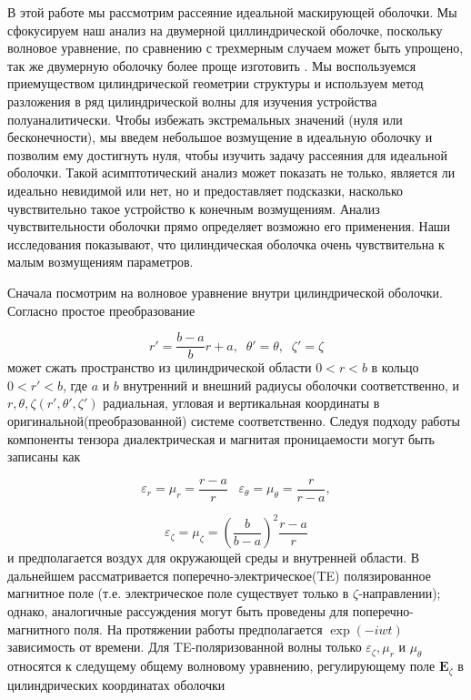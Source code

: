 \documentclass[a4paper, 12pt]{article}
\begin{document}
В этой работе мы рассмотрим рассеяние идеальной маскирующей оболочки.
Мы сфокусируем наш анализ на двумерной циллиндрической
оболочке, поскольку волновое уравнение, по сравнению с трехмерным случаем может быть упрощено, так же двумерную оболочку
более проще изготовить \cite{7}. Мы воспользуемся приемуществом цилиндрической геометрии структуры и используем
метод разложения в ряд цилиндрической волны для изучения устройства полуаналитически. Чтобы избежать экстремальных значений
(нуля или бесконечности), мы введем небольшое возмущение в идеальную оболочку и позволим ему достигнуть нуля, чтобы
изучить задачу рассеяния для идеальной оболочки. Такой асимптотический анализ может показать не только, является ли
идеально невидимой или нет, но и предоставляет подсказки, насколько чувствительно такое устройство к конечным 
возмущениям. Анализ чувствительности оболочки прямо определяет возможно его применения. Наши исследования 
показывают, что цилиндическая оболочка очень чувствительна к малым возмущениям параметров.

Сначала посмотрим на волновое уравнение внутри цилиндрической оболочки. Согласно \cite{1} простое преобразование

\begin{equation}\label{e1}
	r' = \frac{b-a}{b}r+a, \;\; \theta' = \theta, \;\; \zeta' = \zeta
\end{equation}
может сжать пространство из цилиндрической области $0 < r < b$ в кольцо $0 < r' < b$, где $a$ и $b$ внутренний и
внешний радиусы оболочки соответственно, и $r, \theta, \zeta (r', \theta', \zeta')$ радиальная, угловая и вертикальная
координаты в оригинальной(преобразованной) системе соответственно. Следуя подходу работы \cite{1} компоненты тензора 
диалектрическая и магнитая проницаемости могут быть записаны как 

\begin{equation*}
	\varepsilon_r = \mu_r = \frac{r-a}{r} \;\;\; \varepsilon_\theta = \mu_\theta = \frac{r}{r-a},	
\end{equation*}  

\begin{equation}\label{e2}
	\varepsilon_\zeta = \mu_\zeta = (\frac{b}{b-a})^2 \frac{r-a}{r}
\end{equation}
и предполагается воздух для окружающей среды и внутренней области. В дальнейшем рассматривается 
поперечно-электрическое(TE) полязированное магнитное поле (т.е. электрическое поле существует только в 
$\zeta$-направлении); однако, аналогичные рассуждения могут быть проведены для поперечно-магнитного поля. На протяжении
работы предполагается $\exp(-iwt)$ зависимость от времени. Для TE-поляризованной волны только $\varepsilon_\zeta, \mu_r$
и $\mu_\theta$ относятся к следущему общему волновому уравнению, регулирующему поле $\textbf{E}_\zeta$ в цилиндрических 
координатах оболочки
\end{document}
